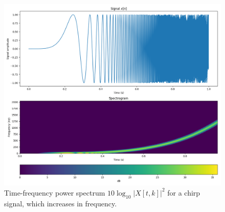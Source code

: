 \begin{figure}
\begin{center}
\includegraphics[width=\textwidth]{code/023_dynamic_spectrum/dynspec.png}
\end{center}
\caption{Time-frequency power spectrum $10 \log_{10}|X[t,k]|^2$ for a chirp signal, which increases in frequency.}
\label{fig:dynamic_spectrum_ex}
\end{figure}





